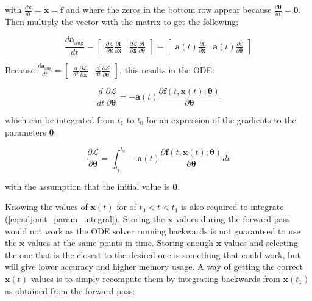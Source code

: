 \documentclass[12pt,a4paper]{book}
\begin{document}
\noindent with $\frac{d \bm{x}}{d t} = \dot{\bm{x}} = \bm{f}$ and where the zeros in the bottom row appear because $\frac{d \bm{\theta}}{d t} = \bm{0}$. Then multiply the vector with the matrix to get the following:

\begin{equation*}
    \frac{d \bm{a}_{\textrm{aug}}}{d t}
    = \begin{bmatrix} \frac{\partial \mathcal{L}}{\partial \bm{x}} \frac{\partial \bm{f}}{\partial \bm{x}} & \frac{\partial \mathcal{L}}{\partial \bm{x}} \frac{\partial \bm{f}}{\partial \bm{\theta}} \end{bmatrix}
    = \begin{bmatrix} \bm{a}(t) \frac{\partial \bm{f}}{\partial \bm{x}} & \bm{a}(t) \frac{\partial \bm{f}}{\partial \bm{\theta}} \end{bmatrix}
\end{equation*}

Because $\frac{d \bm{a}_{\textrm{aug}}}{d t} = \begin{bmatrix} \frac{d}{d t} \frac{\partial \mathcal{L}}{\partial \bm{x}} & \frac{d}{d t}\frac{\partial \mathcal{L}}{\partial \bm{\theta}} \end{bmatrix}$, this results in the ODE: 

\begin{equation*}
    \frac{d}{d t} \frac{\partial \mathcal{L}}{\partial \bm{\theta}} =  - \bm{a}(t) \frac{\partial \bm{f}(t, \bm{x}(t); \bm{\theta})}{\partial \bm{\theta}}
\end{equation*}

\noindent which can be integrated from $t_1$ to $t_0$ for an expression of the gradients to the parameters $\bm{\theta}$:

\begin{equation}
    \frac{\partial \mathcal{L}}{\partial \bm{\theta}} = \int_{t_1}^{t_0} - \bm{a}(t) \frac{\partial \bm{f}(t, \bm{x}(t) ; \bm{\theta})}{\partial \bm{\theta}} dt
    \label{eq:adjoint_param_integral}
\end{equation}

\noindent with the assumption that the initial value is $\bm{0}$.

Knowing the values of $\bm{x}(t)$ for of $t_0 < t < t_1$ is also required to integrate (\ref{eq:adjoint_param_integral}). Storing the $\bm{x}$ values during the forward pass would not work as the ODE solver running backwards is not guaranteed to use the $\bm{x}$ values at the same points in time. Storing enough $\bm{x}$ values and selecting the one that is the closest to the desired one is something that could work, but will give lower accuracy and higher memory usage. A way of getting the correct $\bm{x}(t)$ values is to simply recompute them by integrating backwards from $\bm{x}(t_1)$ as obtained from the forward pass:
\end{document}
